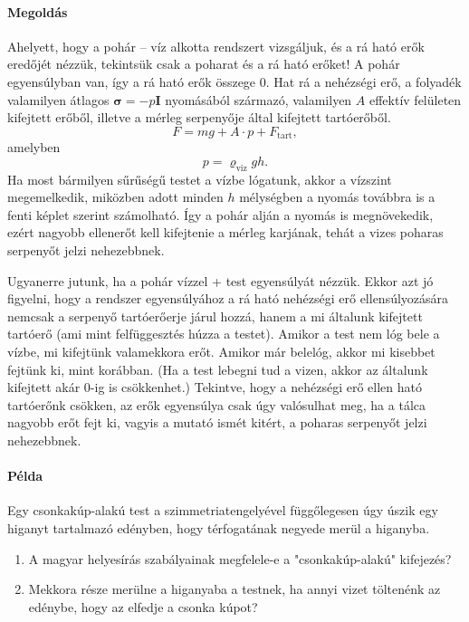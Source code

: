 \documentclass[12pt,a4paper]{scrartcl}
\let\mathbf\bm
\begin{document}
\paragraph{Megoldás}
Ahelyett, hogy a pohár -- víz alkotta rendszert vizsgáljuk, és a rá ható erők eredőjét nézzük, tekintsük csak a poharat és a rá ható erőket! A pohár egyensúlyban van, így a rá ható erők összege 0. Hat rá a nehézségi erő, a folyadék valamilyen átlagos ${\mathbf{\sigma }} =  - p{\mathbf{ I}}$ nyomásából származó, valamilyen $A$ effektív felületen kifejtett erőből, illetve a mérleg serpenyője által kifejtett tartóerőből.
\[F = mg + A \cdot p + {F_{{\text{tart}}}},\]
amelyben
\[p = {\varrho _{{\text{viz}}}}gh.\]
Ha most bármilyen sűrűségű testet a vízbe lógatunk, akkor a vízszint megemelkedik, miközben adott minden $h$ mélységben a nyomás továbbra is a fenti képlet szerint számolható. Így a pohár alján a nyomás is megnövekedik, ezért nagyobb ellenerőt kell kifejtenie a mérleg karjának, tehát a vizes poharas serpenyőt jelzi nehezebbnek.

Ugyanerre jutunk, ha a pohár vízzel + test egyensúlyát nézzük. Ekkor azt jó figyelni, hogy a rendszer egyensúlyához a rá ható nehézségi erő ellensúlyozására nemcsak a serpenyő tartóerőerje járul hozzá, hanem a mi általunk kifejtett tartóerő (ami mint felfüggesztés húzza a testet). Amikor a test nem lóg bele a vízbe, mi kifejtünk valamekkora erőt. Amikor már belelóg, akkor mi kisebbet fejtünk ki, mint korábban. (Ha a test lebegni tud a vizen, akkor az általunk kifejtett akár 0-ig is csökkenhet.) Tekintve, hogy a nehézségi erő ellen ható tartóerőnk csökken, az erők egyensúlya csak úgy valósulhat meg, ha a tálca nagyobb erőt fejt ki, vagyis a mutató ismét kitért, a poharas serpenyőt jelzi nehezebbnek.

\paragraph{Példa}
Egy csonkakúp-alakú test a szimmetriatengelyével függőlegesen úgy úszik egy higanyt tartalmazó edényben, hogy térfogatának negyede merül a higanyba.
\begin{enumerate}
\item A magyar helyesírás szabályainak megfelele-e a "csonkakúp-alakú" kifejezés?
\item Mekkora része merülne a higanyaba a testnek, ha annyi vizet töltenénk az  edénybe, hogy az elfedje a csonka kúpot?
\end{enumerate}
\end{document}
